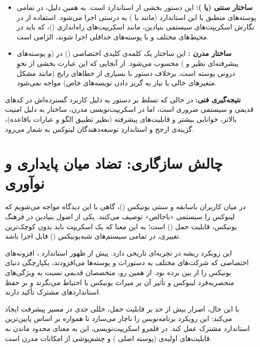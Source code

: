 \begin{itemize}
  \item \textbf{ساختار سنتی  (یا \cmd{[ ]}):} این دستور بخشی از استاندارد  است. به همین دلیل، در تمامی پوسته‌های منطبق با این استاندارد (مانند  یا ) به درستی اجرا می‌شود. استفاده از  در نگارش اسکریپت‌های سیستمی بنیادین، مانند اسکریپت‌های راه‌اندازی ()، که باید در محیط‌های مختلف و با پوسته‌های حداقلی اجرا شوند، الزامی است.

  \item \textbf{ساختار مدرن \cmd{[[ ]]}:} این ساختار یک کلمه‌ی کلیدی اختصاصی () در  (و پوسته‌های پیشرفته‌ای نظیر  و ) محسوب می‌شود. از آنجایی که این عبارت بخشی از نحوِ درونی پوسته است، برخلاف دستور  با بسیاری از خطاهای رایج (مانند مشکل متغیرهای خالی یا نیاز به گریز دادن نویسه‌های خاص) مواجه نمی‌شود.
\end{itemize}

\textbf{نتیجه‌گیری فنی:} در حالی که تسلط بر دستور  به دلیل کاربرد گسترده‌اش در کدهای قدیمی و سیستمی ضروری است، اما در اسکریپت‌نویسی مدرن، ساختار \cmd{[[ ]]} به دلیل امنیت بالاتر، خوانایی بیشتر و قابلیت‌های پیشرفته (نظیر تطبیق الگو و عبارات باقاعده)، گزینه‌ی ارجح و استانداردِ توسعه‌دهندگان لینوکس به شمار می‌رود.

\section{چالش سازگاری: تضاد میان پایداری و نوآوری}

در میان کاربران باسابقه و سنتی یونیکس ()، گاهی با این دیدگاه مواجه می‌شویم که لینوکس را سیستمی «ناخالص» توصیف می‌کنند. یکی از اصول بنیادین در فرهنگ یونیکس، قابلیت حمل () است؛ به این معنا که یک اسکریپت باید بدون کوچک‌ترین تغییری، در تمامی سیستم‌های شبه‌یونیکس () قابل اجرا باشد.

این رویکرد ریشه در تجربه‌ای تاریخی دارد. پیش از ظهور استاندارد ، افزونه‌های اختصاصی که شرکت‌های مختلف به دستورات و پوسته‌ها می‌افزودند، یکپارچگی دنیای یونیکس را از بین برده بود. از همین رو، متخصصان قدیمی نسبت به ویژگی‌های منحصربه‌فرد لینوکس و تأثیر آن بر میراث یونیکس با احتیاط می‌نگرند و بر حفظ استانداردهای مشترک تأکید دارند.

با این حال، اصرار بیش از حد بر قابلیت حمل، خللی جدی در مسیر پیشرفت ایجاد می‌کند: این رویکرد برنامه‌نویس را ناچار می‌سازد تا همواره بر اساس پایین‌ترین استاندارد مشترک عمل کند. در قلمرو اسکریپت‌نویسی، این به معنای محدود ماندن به قابلیت‌های اولیه‌ی  (پوسته اصلی ) و چشم‌پوشی از امکانات مدرن است.

